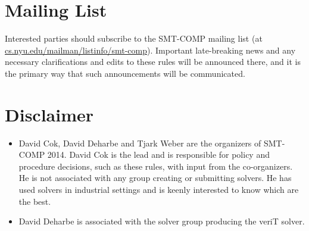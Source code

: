 \documentclass[12pt]{article}
\begin{document}
\section{Mailing List}
\label{sec:ps}

Interested parties should subscribe to the SMT-COMP mailing list (at \url{cs.nyu.edu/mailman/listinfo/smt-comp}).
Important
late-breaking news and any necessary clarifications and edits to these
rules will be announced there, and it is the primary way that such
announcements will be communicated.

\section{Disclaimer}
\begin{itemize}
\item David Cok, David Deharbe and Tjark Weber are the organizers of SMT-COMP 2014. 
David Cok is the lead and is 
responsible for policy and procedure decisions, such as these
rules, with input from the co-organizers. He is not associated 
with any group creating or submitting solvers. He has used solvers
in industrial settings and is keenly interested to know which are the best.

\item David Deharbe is associated with the solver group producing the veriT solver.
\end{itemize}


\end{document}
